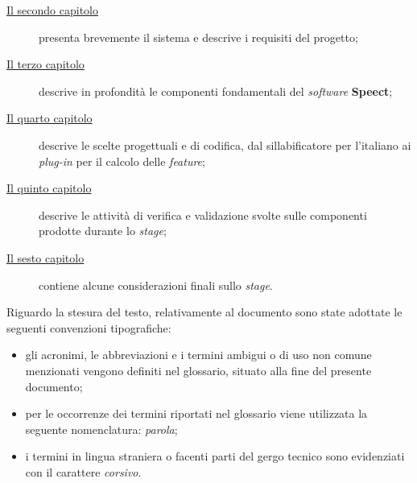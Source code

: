 \begin{description}
    \item[{\hyperref[cap:analisi-requisiti]{Il secondo capitolo}}] presenta brevemente il sistema e descrive i requisiti del progetto;
    
    \item[{\hyperref[cap:speect]{Il terzo capitolo}}] descrive in profondità le componenti fondamentali del \textit{software} \textbf{Speect};
    
    
    \item[{\hyperref[cap:progettazione-realizzazione]{Il quarto capitolo}}] descrive le scelte progettuali e di codifica, dal sillabificatore
      per l'italiano ai \textit{plug-in} per il calcolo delle \textit{feature};
    
    \item[{\hyperref[cap:verifica-validazione]{Il quinto capitolo}}] descrive le attività di verifica e validazione svolte sulle
      componenti prodotte durante lo \textit{stage};
    
    \item[{\hyperref[cap:conclusioni]{Il sesto capitolo}}] contiene alcune considerazioni finali sullo \textit{stage}.
\end{description}

Riguardo la stesura del testo, relativamente al documento sono state adottate le seguenti convenzioni tipografiche:
\begin{itemize}
	\item gli acronimi, le abbreviazioni e i termini ambigui o di uso non comune menzionati vengono definiti nel glossario, situato alla fine del presente documento;
	\item per le occorrenze dei termini riportati nel glossario viene utilizzata la seguente nomenclatura: \emph{parola}\glsfirstoccur;
	\item i termini in lingua straniera o facenti parti del gergo tecnico sono evidenziati con il carattere \emph{corsivo}.
\end{itemize}
